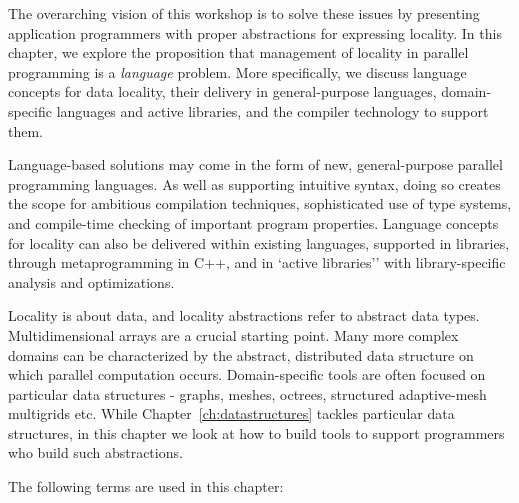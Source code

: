 The overarching vision of this workshop is to solve these issues by presenting application programmers with proper abstractions for expressing locality. In this chapter, we explore the proposition that management of locality in parallel programming is a \emph{language} problem. More specifically, we discuss language concepts for data locality, their delivery in general-purpose languages, domain-specific languages and active libraries, and the compiler technology to support them. 
 
Language-based solutions may come in the form of new, general-purpose parallel
programming languages.  As well as supporting intuitive syntax, doing so creates the scope for ambitious compilation techniques, sophisticated use of type systems, and compile-time checking of important program properties. Language concepts for locality can also be delivered within existing languages, supported in libraries, through metaprogramming in C++, and in `active libraries'' with library-specific analysis and optimizations.
 

Locality is about data, and locality abstractions refer to abstract data types. Multidimensional arrays are a crucial starting point.  Many more complex domains can be characterized by the abstract, distributed data structure on which parallel computation occurs. Domain-specific tools are often focused on particular data structures - graphs, meshes, octrees, structured adaptive-mesh multigrids etc.  While Chapter~\ref{ch:datastructures} tackles particular data structures, in this chapter we look at how to build tools to support programmers who build such abstractions.

The following terms are used in this chapter:

